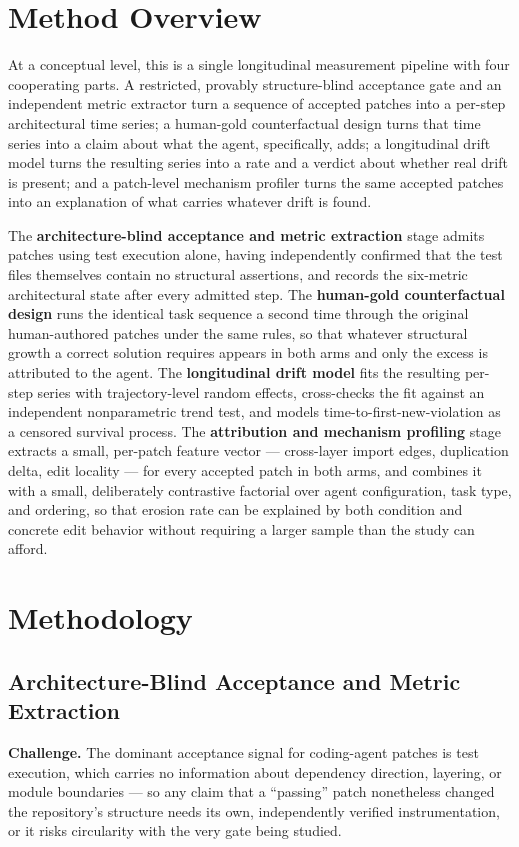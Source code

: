 \documentclass[11pt]{article}
\begin{document}
\section{Method Overview}

At a conceptual level, this is a single longitudinal measurement pipeline with four cooperating parts. A restricted, provably structure-blind acceptance gate and an independent metric extractor turn a sequence of accepted patches into a per-step architectural time series; a human-gold counterfactual design turns that time series into a claim about what the agent, specifically, adds; a longitudinal drift model turns the resulting series into a rate and a verdict about whether real drift is present; and a patch-level mechanism profiler turns the same accepted patches into an explanation of what carries whatever drift is found.

The \textbf{architecture-blind acceptance and metric extraction} stage admits patches using test execution alone, having independently confirmed that the test files themselves contain no structural assertions, and records the six-metric architectural state after every admitted step. The \textbf{human-gold counterfactual design} runs the identical task sequence a second time through the original human-authored patches under the same rules, so that whatever structural growth a correct solution requires appears in both arms and only the excess is attributed to the agent. The \textbf{longitudinal drift model} fits the resulting per-step series with trajectory-level random effects, cross-checks the fit against an independent nonparametric trend test, and models time-to-first-new-violation as a censored survival process. The \textbf{attribution and mechanism profiling} stage extracts a small, per-patch feature vector --- cross-layer import edges, duplication delta, edit locality --- for every accepted patch in both arms, and combines it with a small, deliberately contrastive factorial over agent configuration, task type, and ordering, so that erosion rate can be explained by both condition and concrete edit behavior without requiring a larger sample than the study can afford.

\section{Methodology}

\subsection{Architecture-Blind Acceptance and Metric Extraction}
\textbf{Challenge.} The dominant acceptance signal for coding-agent patches is test execution, which carries no information about dependency direction, layering, or module boundaries --- so any claim that a ``passing'' patch nonetheless changed the repository's structure needs its own, independently verified instrumentation, or it risks circularity with the very gate being studied.
\end{document}
